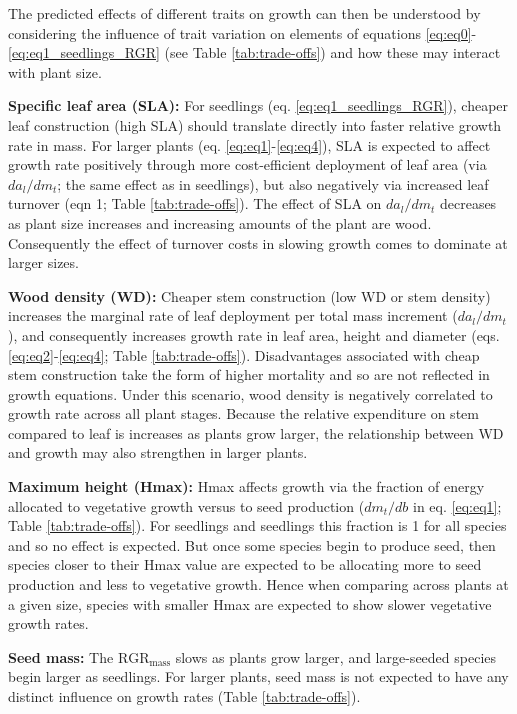 \documentclass[a4paper,11pt]{article}
\begin{document}
\begin{appendices}
The predicted effects of different traits on growth can then be understood by considering the influence of trait variation on elements of equations  \ref{eq:eq0}-\ref{eq:eq1_seedlings_RGR} (see Table \ref{tab:trade-offs}) and how these may interact with plant size.


\textbf{Specific leaf area (SLA):} For seedlings (eq. \ref{eq:eq1_seedlings_RGR}), cheaper leaf construction (high SLA) should translate directly into faster relative growth rate in mass. For larger plants (eq. \ref{eq:eq1}-\ref{eq:eq4}), SLA is expected to affect growth rate positively through more cost-efficient deployment of leaf area (via $da_l/dm_t$; the same effect as in seedlings), but also negatively via increased leaf turnover (eqn 1; Table \ref{tab:trade-offs}). The effect of SLA on $da_l/dm_t$ decreases as plant size increases and increasing amounts of the plant are wood. Consequently the effect of turnover costs in slowing growth comes to dominate at larger sizes.

\textbf{Wood density (WD):} Cheaper stem construction (low WD or stem density) increases the marginal rate of leaf deployment per total mass increment ($da_l/dm_t$), and consequently increases growth rate in leaf area, height and diameter (eqs. \ref{eq:eq2}-\ref{eq:eq4}; Table \ref{tab:trade-offs}). Disadvantages associated with cheap stem construction take the form of higher mortality and so are not reflected in growth equations. Under this scenario, wood density is negatively correlated to growth rate across all plant stages. Because the relative expenditure on stem compared to leaf is increases as plants grow larger, the relationship between WD and growth may also strengthen in larger plants.

\textbf{Maximum height (Hmax):} Hmax affects growth via the fraction of energy allocated to vegetative growth versus to seed production ($dm_t/db$ in eq. \ref{eq:eq1}; Table \ref{tab:trade-offs}). For seedlings and seedlings this fraction is 1 for all species and so no effect is expected. But once some species begin to produce seed, then species closer to their Hmax value are expected to be allocating more to seed production and less to vegetative growth. Hence when comparing across plants at a given size, species with smaller Hmax are expected to show slower vegetative growth rates.

\textbf{Seed mass:} The $\textrm{RGR}_{\textrm{mass}}$ slows as plants grow larger, and large-seeded species begin larger as seedlings. For larger plants, seed mass is not expected to have any distinct influence on growth rates  (Table \ref{tab:trade-offs}).


\end{appendices}
\end{document}
